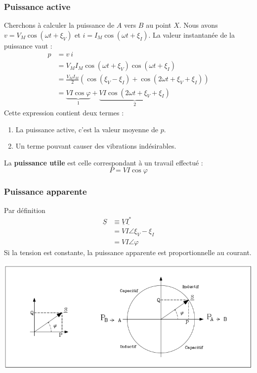 \subsubsection{Puissance active}
Cherchons à calculer la puissance de $A$ vers $B$ au point $X$. Nous 
avons $v = V_M\cos(\omega t +\xi_V)$ et $i = I_M\cos(\omega t + \xi_I)$. 
La valeur instantanée de la puissance vaut :
\begin{equation}
	\begin{array}{ll}
		p & = v\ i                                                               \\
		  & = V_MI_M\cos(\omega t +\xi_V)\cos(\omega t +\xi_I)                   \\
		  & = \frac{V_MI_M}{2}(\cos(\xi_V-\xi_I) + \cos(2\omega t +\xi_V+\xi_I)) \\
		  & = \underbrace{VI \cos\varphi}_{1} + \underbrace{VI \cos(2\omega t +  
		\xi_V+\xi_I)}_{2}
	\end{array}
\end{equation}
Cette expression contient deux termes :
\begin{enumerate}
	\item La puissance active, c'est la valeur moyenne de $p$.
	\item Un terme pouvant causer des vibrations indésirables.
\end{enumerate}
La \textbf{puissance utile} est celle correspondant à un travail 
effectué :
\begin{equation}
	P = VI \cos\varphi
\end{equation}
		
\subsubsection{Puissance apparente}
Par définition
\begin{equation}
	\begin{array}{ll}
		\underline{S} & \equiv \underline{V}\underline{I^*} \\
		              & = VI \angle \xi_V-\xi_I             \\
		              & = VI\angle\varphi                   
	\end{array}
\end{equation}
Si la tension est constante, la puissance apparente est proportionnelle 
au courant.
\begin{center}
	\includegraphics[scale=0.4]{ch1/image4.png}
\end{center}	
		
